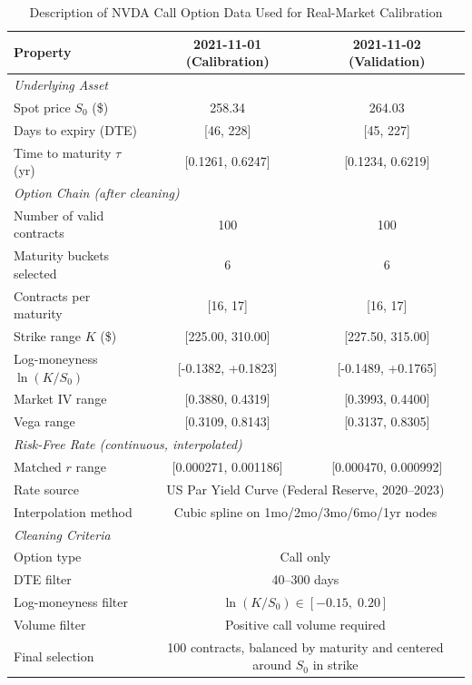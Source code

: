 \begin{table}[htbp]
  \centering
  \caption{Description of NVDA Call Option Data Used for Real-Market Calibration}
  \label{tab:nvda_data}
  \begin{tabular}{lcc}
    \toprule
    \textbf{Property} & \textbf{2021-11-01 (Calibration)} & \textbf{2021-11-02 (Validation)} \\
    \midrule
    \multicolumn{3}{l}{\textit{Underlying Asset}} \\
    \quad Spot price $S_0$ (\$)       & 258.34 & 264.03 \\
    \quad Days to expiry (DTE)        & [46, 228] & [45, 227] \\
    \quad Time to maturity $\tau$ (yr)& [0.1261, 0.6247] & [0.1234, 0.6219] \\
    \midrule
    \multicolumn{3}{l}{\textit{Option Chain (after cleaning)}} \\
    \quad Number of valid contracts   & 100 & 100 \\
    \quad Maturity buckets selected    & 6 & 6 \\
    \quad Contracts per maturity       & [16, 17] & [16, 17] \\
    \quad Strike range $K$ (\$)       & [225.00, 310.00] & [227.50, 315.00] \\
    \quad Log-moneyness $\ln(K/S_0)$  & [-0.1382, +0.1823] & [-0.1489, +0.1765] \\
    \quad Market IV range             & [0.3880, 0.4319] & [0.3993, 0.4400] \\
    \quad Vega range                  & [0.3109, 0.8143] & [0.3137, 0.8305] \\
    \midrule
    \multicolumn{3}{l}{\textit{Risk-Free Rate (continuous, interpolated)}} \\
    \quad Matched $r$ range           & [0.000271, 0.001186] & [0.000470, 0.000992] \\
    \quad Rate source                 & \multicolumn{2}{c}{US Par Yield Curve (Federal Reserve, 2020--2023)} \\
    \quad Interpolation method        & \multicolumn{2}{c}{Cubic spline on 1mo/2mo/3mo/6mo/1yr nodes} \\
    \midrule
    \multicolumn{3}{l}{\textit{Cleaning Criteria}} \\
    \quad Option type                 & \multicolumn{2}{c}{Call only} \\
    \quad DTE filter                  & \multicolumn{2}{c}{40--300 days} \\
    \quad Log-moneyness filter        & \multicolumn{2}{c}{$\ln(K/S_0) \in [-0.15,\;0.20]$} \\
    \quad Volume filter               & \multicolumn{2}{c}{Positive call volume required} \\
    \quad Final selection             & \multicolumn{2}{c}{100 contracts, balanced by maturity and centered around $S_0$ in strike} \\
    \bottomrule
  \end{tabular}
\end{table}
